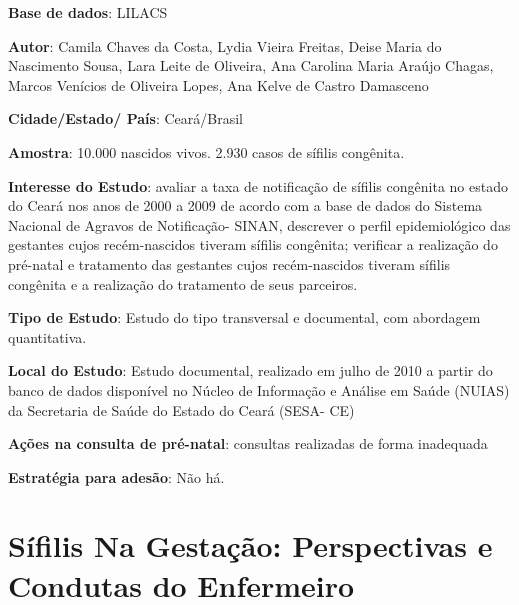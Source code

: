 \begin{description}
\item \textbf{Base de dados}: LILACS
\item \textbf{Autor}: Camila Chaves da Costa, Lydia Vieira Freitas, Deise Maria do Nascimento Sousa, Lara Leite de Oliveira, Ana Carolina Maria Araújo Chagas, Marcos Venícios de Oliveira Lopes, Ana Kelve de Castro Damasceno
\item \textbf{Cidade/Estado/ País}: Ceará/Brasil
\item \textbf{Amostra}: 10.000 nascidos vivos. 2.930 casos de sífilis congênita.
\item \textbf{Interesse do Estudo}: avaliar a taxa de notificação de sífilis congênita no estado do Ceará nos anos de 2000 a 2009 de acordo com a base de dados do Sistema Nacional de Agravos de Notificação- SINAN, descrever o perfil epidemiológico das gestantes cujos recém-nascidos tiveram sífilis congênita; verificar a realização do pré-natal e tratamento das gestantes cujos recém-nascidos tiveram sífilis congênita e a realização do tratamento de seus parceiros.
\item \textbf{Tipo de Estudo}: Estudo do tipo transversal e documental, com abordagem quantitativa.
\item \textbf{Local do Estudo}: Estudo documental, realizado em julho de 2010 a partir do banco de dados disponível no Núcleo de Informação e Análise em Saúde (NUIAS) da Secretaria de Saúde do Estado do Ceará (SESA- CE)
\item \textbf{Ações na consulta de pré-natal}: consultas realizadas de forma inadequada
\item \textbf{Estratégia para adesão}: Não há.
\end{description}

\section{Sífilis Na Gestação: Perspectivas e Condutas do Enfermeiro \cite{nunes2017sifilis}}

